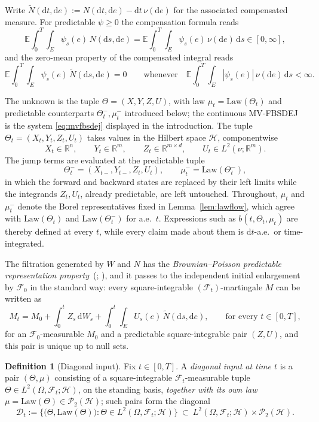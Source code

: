 \documentclass[preprint,12pt]{elsarticle}
\newcommand{\R}{\mathbb{R}}
\newcommand{\E}{\mathbb{E}}
\newcommand{\F}{\mathcal{F}}
\newcommand{\diff}{\mathrm{d}}
\newcommand{\Nt}{\widetilde{N}}
\newcommand{\Law}{\mathrm{Law}}
\numberwithin{equation}{section}
\theoremstyle{plain}
\theoremstyle{definition}
\newtheorem{definition}[theorem]{Definition}
\theoremstyle{\PaperRemarkStyle}
\begin{document}
Write $\Nt(\diff t,\diff e):=N(\diff t,\diff e)-\diff t\,\nu(\diff e)$ for the
associated compensated measure. For predictable $\psi\ge0$ the compensation formula
reads
\begin{equation}\label{eq:compid}
\E\!\int_0^T\!\!\int_E\psi_s(e)\,N(\diff s,\diff e)
=\E\!\int_0^T\!\!\int_E\psi_s(e)\,\nu(\diff e)\,\diff s\in[0,\infty],
\end{equation}
and the zero-mean property of the compensated integral reads
\begin{equation}\label{eq:zeromean}
\E\!\int_0^T\!\!\int_E\psi_s(e)\,\Nt(\diff s,\diff e)=0
\qquad\text{whenever}\quad
\E\!\int_0^T\!\!\int_E|\psi_s(e)|\,\nu(\diff e)\,\diff s<\infty .
\end{equation}

The unknown is the tuple $\Theta=(X,Y,Z,U)$, with law $\mu_t=\Law(\Theta_t)$ and predictable
counterparts $\Theta_t^-,\mu_t^-$ introduced below; the continuous MV-FBSDEJ is the system
\eqref{eq:mvfbsdej} displayed in the introduction. The tuple
$\Theta_t=(X_t,Y_t,Z_t,U_t)$ takes values in the Hilbert space $\mathcal H$,
componentwise
\[
X_t\in\R^n,\qquad Y_t\in\R^m,\qquad Z_t\in\R^{m\times d},\qquad U_t\in L^2(\nu;\R^m).
\]
The jump terms are evaluated at the predictable tuple
\[
\Theta_t^-=(X_{t-},Y_{t-},Z_t,U_t),\qquad \mu_t^-=\Law(\Theta_t^-),
\]
in which the forward and backward states are replaced by their left limits while the
integrands $Z_t,U_t$, already predictable, are left untouched.
Throughout, $\mu_t$ and $\mu_t^-$ denote the Borel
representatives fixed in Lemma~\ref{lem:lawflow}, which agree with $\Law(\Theta_t)$ and
$\Law(\Theta_t^-)$ for a.e.\ $t$. Expressions such as $b(t,\Theta_t,\mu_t)$ are thereby
defined at every $t$, while every claim made about them is $\diff t$-a.e.\ or
time-integrated.

The filtration generated by $W$ and $N$ has the \emph{Brownian--Poisson predictable
representation property}~(\cite[\S5.3]{Applebaum}; \cite[Theorem~13.49]{HeWangYan}), and it
passes to the independent initial enlargement by $\F_0$ in the standard way:
every square-integrable $(\F_t)$-martingale $M$ can be written as
\[
M_t=M_0+\int_0^t Z_s\,\diff W_s+\int_0^t\!\!\int_E U_s(e)\,\Nt(\diff s,\diff e),
\qquad\text{for every }t\in[0,T],
\]
for an $\F_0$-measurable $M_0$ and a predictable square-integrable pair $(Z,U)$, and this
pair is unique up to null sets.

\begin{definition}[Diagonal input]\label{def:diag}
Fix $t\in[0,T]$. A \emph{diagonal input at time $t$} is a pair $(\Theta,\mu)$ consisting of a
square-integrable $\F_t$-measurable tuple $\Theta\in L^2(\Omega,\F_t;\mathcal H)$, on the
standing basis, \emph{together with its own law} $\mu=\Law(\Theta)\in\mathcal P_2(\mathcal H)$;
such pairs form the diagonal
\[
\mathcal D_t:=\bigl\{\bigl(\Theta,\Law(\Theta)\bigr):\Theta\in L^2(\Omega,\F_t;\mathcal H)\bigr\}
\ \subset\ L^2(\Omega,\F_t;\mathcal H)\times\mathcal P_2(\mathcal H).
\]
\end{definition}
\end{document}
